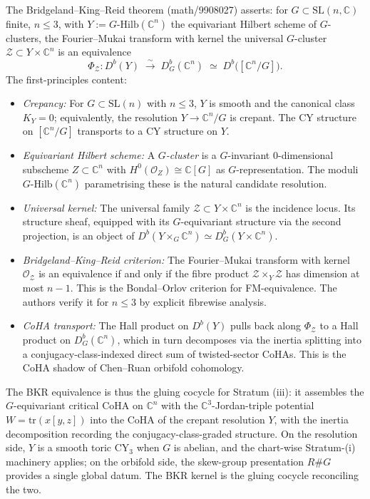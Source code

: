 The Bridgeland--King--Reid theorem (math/9908027) asserts: for $G \subset \mathrm{SL}(n, \mathbb{C})$ finite, $n \leq 3$, with $Y := G\text{-}\mathrm{Hilb}(\mathbb{C}^n)$ the equivariant Hilbert scheme of $G$-clusters, the Fourier--Mukai transform with kernel the universal $G$-cluster $\mathcal{Z} \subset Y \times \mathbb{C}^n$ is an equivalence
\[
\Phi_{\mathcal{Z}} \colon D^b(Y) \;\xrightarrow{\sim}\; D^b_G(\mathbb{C}^n) \;\simeq\; D^b\bigl([\mathbb{C}^n/G]\bigr).
\]
The first-principles content:
\begin{itemize}
  \item \emph{Crepancy:} For $G \subset \mathrm{SL}(n)$ with $n \leq 3$, $Y$ is smooth and the canonical class $K_Y = 0$; equivalently, the resolution $Y \to \mathbb{C}^n/G$ is crepant. The CY structure on $[\mathbb{C}^n/G]$ transports to a CY structure on $Y$.
  \item \emph{Equivariant Hilbert scheme:} A \emph{$G$-cluster} is a $G$-invariant $0$-dimensional subscheme $Z \subset \mathbb{C}^n$ with $H^0(\mathcal{O}_Z) \cong \mathbb{C}[G]$ as $G$-representation. The moduli $G\text{-}\mathrm{Hilb}(\mathbb{C}^n)$ parametrising these is the natural candidate resolution.
  \item \emph{Universal kernel:} The universal family $\mathcal{Z} \subset Y \times \mathbb{C}^n$ is the incidence locus. Its structure sheaf, equipped with its $G$-equivariant structure via the second projection, is an object of $D^b(Y \times_G \mathbb{C}^n) \simeq D^b_G(Y \times \mathbb{C}^n)$.
  \item \emph{Bridgeland--King--Reid criterion:} The Fourier--Mukai transform with kernel $\mathcal{O}_{\mathcal{Z}}$ is an equivalence if and only if the fibre product $\mathcal{Z} \times_Y \mathcal{Z}$ has dimension at most $n - 1$. This is the Bondal--Orlov criterion for FM-equivalence. The authors verify it for $n \leq 3$ by explicit fibrewise analysis.
  \item \emph{CoHA transport:} The Hall product on $D^b(Y)$ pulls back along $\Phi_{\mathcal{Z}}$ to a Hall product on $D^b_G(\mathbb{C}^n)$, which in turn decomposes via the inertia splitting into a conjugacy-class-indexed direct sum of twisted-sector CoHAs. This is the CoHA shadow of Chen--Ruan orbifold cohomology.
\end{itemize}

The BKR equivalence is thus the gluing cocycle for Stratum (iii): it assembles the $G$-equivariant critical CoHA on $\mathbb{C}^n$ with the $\mathbb{C}^3$-Jordan-triple potential $W = \mathrm{tr}(x[y,z])$ into the CoHA of the crepant resolution $Y$, with the inertia decomposition recording the conjugacy-class-graded structure. On the resolution side, $Y$ is a smooth toric CY$_3$ when $G$ is abelian, and the chart-wise Stratum-(i) machinery applies; on the orbifold side, the skew-group presentation $R \# G$ provides a single global datum. The BKR kernel is the gluing cocycle reconciling the two.

